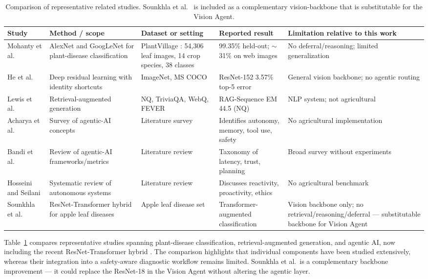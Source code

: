 \documentclass[conference]{IEEEtran}
\begin{document}
\begin{table}[!t]
\centering
\caption{Comparison of representative related studies. Sounkhla et al.\ \cite{r_sounkhla2026} is included as a complementary vision-backbone that is substitutable for the Vision Agent.}
\label{tab:related_work_summary}
\footnotesize
\setlength{\tabcolsep}{3pt}
\renewcommand{\arraystretch}{1.12}
\begin{tabular}{p{2.0cm}p{2.8cm}p{3.2cm}p{4.0cm}p{3.5cm}}
\toprule
\textbf{Study} & \textbf{Method / scope} & \textbf{Dataset or setting} & \textbf{Reported result} & \textbf{Limitation relative to this work} \\
\midrule
Mohanty et al.\ \cite{r_mohanty2016} & AlexNet and GoogLeNet for plant-disease classification & PlantVillage \cite{r_hughes2015}: 54{,}306 leaf images, 14 crop species, 38 classes & 99.35\% held-out; $\sim$31\% on web images & No deferral/reasoning; limited generalization \\
He et al.\ \cite{r_he2016} & Deep residual learning with identity shortcuts & ImageNet, MS COCO & ResNet-152 3.57\% top-5 error & General vision backbone; no agentic routing \\
Lewis et al.\ \cite{r_lewis2020} & Retrieval-augmented generation & NQ, TriviaQA, WebQ, FEVER & RAG-Sequence EM 44.5 (NQ) & NLP system; not agricultural \\
Acharya et al.\ \cite{b1} & Survey of agentic-AI concepts & Literature survey & Identifies autonomy, memory, tool use, safety & No agricultural implementation \\
Bandi et al.\ \cite{b2} & Review of agentic-AI frameworks/metrics & Literature review & Taxonomy of latency, trust, planning & Broad survey without experiments \\
Hosseini and Seilani \cite{b6} & Systematic review of autonomous systems & Literature review & Discusses reactivity, proactivity, ethics & No agricultural benchmark \\
Sounkhla et al.\ \cite{r_sounkhla2026} & ResNet-Transformer hybrid for apple leaf diseases & Apple leaf disease set & Transformer-augmented classification & Vision backbone only; no retrieval/reasoning/deferral — substitutable backbone for Vision Agent \\
\bottomrule
\end{tabular}
\renewcommand{\arraystretch}{1}
\end{table}

Table~\ref{tab:related_work_summary} compares representative studies spanning plant-disease classification, retrieval-augmented generation, and agentic AI, now including the recent ResNet-Transformer hybrid \cite{r_sounkhla2026}. The comparison highlights that individual components have been studied extensively, whereas their integration into a safety-aware diagnostic workflow remains limited. Sounkhla et al.\ is a complementary backbone improvement — it could replace the ResNet-18 in the Vision Agent without altering the agentic layer.
\end{document}
